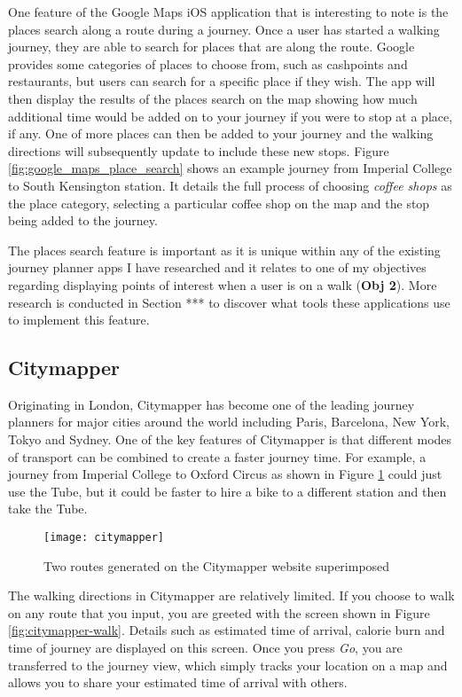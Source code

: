 One feature of the Google Maps iOS application that is interesting to note is the places search along a route during a journey. Once a user has started a walking journey, they are able to search for places that are along the route. Google provides some categories of places to choose from, such as cashpoints and restaurants, but users can search for a specific place if they wish. The app will then display the results of the places search on the map showing how much additional time would be added on to your journey if you were to stop at a place, if any. One of more places can then be added to your journey and the walking directions will subsequently update to include these new stops. Figure \ref{fig:google_maps_place_search} shows an example journey from Imperial College to South Kensington station. It details the full process of choosing \textit{coffee shops} as the place category, selecting a particular coffee shop on the map and the stop being added to the journey.

The places search feature is important as it is unique within any of the existing journey planner apps I have researched and it relates to one of my objectives regarding displaying points of interest when a user is on a walk (\textbf{Obj 2}). More research is conducted in Section *** to discover what tools these applications use to implement this feature.

\subsection{Citymapper}

Originating in London, Citymapper \cite{Citymapper} has become one of the leading journey planners for major cities around the world including Paris, Barcelona, New York, Tokyo and Sydney. One of the key features of Citymapper is that different modes of transport can be combined to create a faster journey time. For example, a journey from Imperial College to Oxford Circus as shown in Figure \ref{fig:citymapper} could just use the Tube, but it could be faster to hire a bike to a different station and then take the Tube.

\begin{figure}[hbt]
  \centering
  \texttt{[image: citymapper]}
  \caption{Two routes generated on the Citymapper website superimposed}
  \label{fig:citymapper}
\end{figure}

The walking directions in Citymapper are relatively limited. If you choose to walk on any route that you input, you are greeted with the screen shown in Figure \ref{fig:citymapper-walk}. Details such as estimated time of arrival, calorie burn and time of journey are displayed on this screen. Once you press \textit{Go}, you are transferred to the journey view, which simply tracks your location on a map and allows you to share your estimated time of arrival with others.

